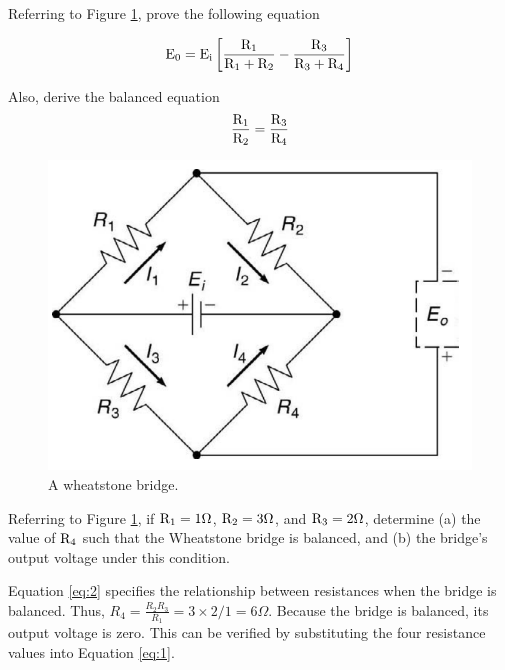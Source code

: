 \documentclass[a4paper,11pt]{book}
\begin{document}
\begin{question}

Referring to Figure \ref{fig:wheatstone}, prove the following equation

\begin{equation} \label{eq:1}
 {\rm E_0 = E_i \left[ \frac{R_1}{R_1+R_2} - \frac{R_3}{R_3+R_4} \right]}
\end{equation}

Also, derive the balanced equation 
\begin{equation} \label{eq:2}
 {\rm \frac{R_1}{R_2} = \frac{R_3}{R_4} }
\end{equation}

\begin{figure}[t!]
\centering
\includegraphics[scale=0.6]{wheatstone}
\caption{A wheatstone bridge.}\label{fig:wheatstone}
\end{figure}
\examspace{8em}

\end{question}
\begin{solution}

\end{solution}


\begin{question}

Referring to Figure \ref{fig:wheatstone}, if ${\rm R_1 = 1 \Omega}$, ${\rm R_2 = 3 \Omega}$, and ${\rm R_3 = 2 \Omega}$,
determine (a) the value of ${\rm R_4}$ such that the Wheatstone bridge is balanced, and (b) the bridge’s output voltage under this condition.

\end{question}
\begin{solution}

Equation \ref{eq:2} specifies the relationship between resistances when the bridge is balanced. Thus, $R_4 = \frac{R_2 R_3}{R_1} = 3 \times 2 / 1 = 6 \Omega$. Because the bridge is balanced, its output voltage is zero. This can be verified by substituting the four resistance values into Equation \ref{eq:1}.

\end{solution}
\end{document}
